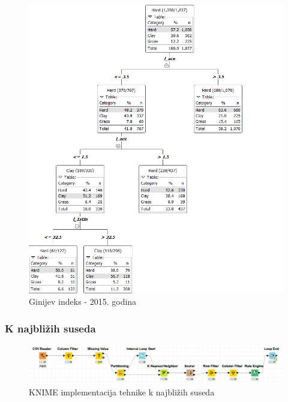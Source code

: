 \documentclass[a4paper]{article}
\begin{document}
\begin{figure}[H]
	\begin{center}
		\includegraphics[width=\textwidth]{Klasifikacija/DrvoOdlucivanja/2015/DrvoOdlucivanja.png}
	\end{center}
	\caption{Ginijev indeks - 2015. godina}
	\label{fig:DrvoOdlucivanja2015}
\end{figure}

\subsubsection{K najbližih suseda}

\begin{figure}[H]
	\begin{center}
		\includegraphics[width=\textwidth]{Klasifikacija/kNN/KNIME_kNNCvorovi.png}
	\end{center}
	\caption{KNIME implementacija tehnike k najbližih suseda}
	\label{fig:KNIME_CvorovikNN}
\end{figure}
\end{document}
